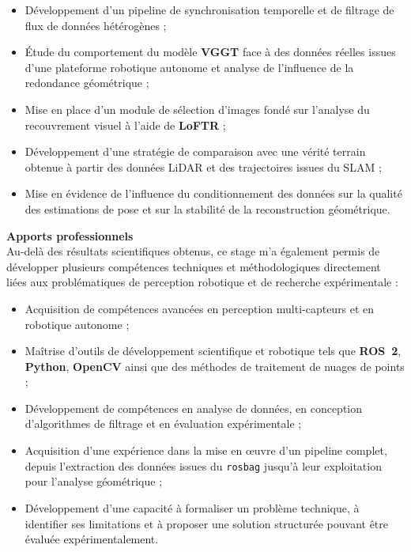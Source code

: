 \documentclass[12pt,a4paper,oneside]{report}
\begin{document}
\begin{itemize}[itemsep=0.5em]
    \item Développement d'un pipeline de synchronisation temporelle et de filtrage de flux de données hétérogènes ;
    
    \item Étude du comportement du modèle \textbf{VGGT} face à des données réelles issues d'une plateforme robotique autonome et analyse de l'influence de la redondance géométrique ;
    
    \item Mise en place d'un module de sélection d'images fondé sur l'analyse du recouvrement visuel à l'aide de \textbf{LoFTR} ;
    
    \item Développement d'une stratégie de comparaison avec une vérité terrain obtenue à partir des données LiDAR et des trajectoires issues du SLAM ;
    
    \item Mise en évidence de l'influence du conditionnement des données sur la qualité des estimations de pose et sur la stabilité de la reconstruction géométrique.
\end{itemize}

\par\bigskip
\par\bigskip

\hspace*{0.4cm}\textbf{Apports professionnels}\\

\hspace*{.3cm}Au-delà des résultats scientifiques obtenus, ce stage m'a également permis de développer plusieurs compétences techniques et méthodologiques directement liées aux problématiques de perception robotique et de recherche expérimentale :

\begin{itemize}[itemsep=0.5em]
    \item Acquisition de compétences avancées en perception multi-capteurs et en robotique autonome ;
    
    \item Maîtrise d'outils de développement scientifique et robotique tels que \textbf{ROS~2}, \textbf{Python}, \textbf{OpenCV} ainsi que des méthodes de traitement de nuages de points ;
    
    \item Développement de compétences en analyse de données, en conception d'algorithmes de filtrage et en évaluation expérimentale ;
    
    \item Acquisition d'une expérience dans la mise en œuvre d'un pipeline complet, depuis l'extraction des données issues du \texttt{rosbag} jusqu'à leur exploitation pour l'analyse géométrique ;
    
    \item Développement d'une capacité à formaliser un problème technique, à identifier ses limitations et à proposer une solution structurée pouvant être évaluée expérimentalement.
\end{itemize}
\end{document}
